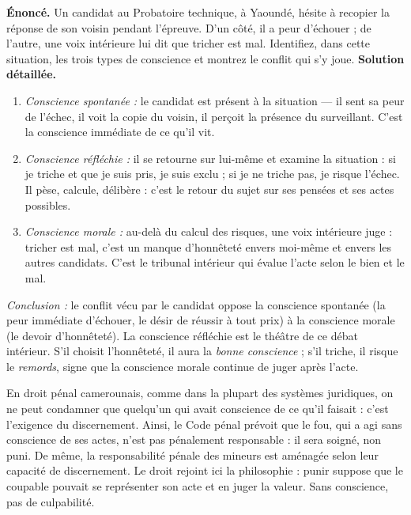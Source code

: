 \documentclass[11pt]{article}
\newcommand{\cle}[1]{{\popxbold\color{popdark}#1}}
\begin{document}
\begin{exoresolu}
\textbf{Énoncé.} Un candidat au Probatoire technique, à Yaoundé, hésite à recopier la réponse de son voisin pendant l'épreuve. D'un côté, il a peur d'échouer ; de l'autre, une voix intérieure lui dit que tricher est mal. Identifiez, dans cette situation, les trois types de conscience et montrez le conflit qui s'y joue.
\tcblower
\textbf{Solution détaillée.}
\begin{enumerate}
\item \emph{Conscience spontanée :} le candidat est présent à la situation — il sent sa peur de l'échec, il voit la copie du voisin, il perçoit la présence du surveillant. C'est la conscience immédiate de ce qu'il vit.
\item \emph{Conscience réfléchie :} il se retourne sur lui-même et examine la situation : \og si je triche et que je suis pris, je suis exclu ; si je ne triche pas, je risque l'échec. \fg{} Il pèse, calcule, délibère : c'est le retour du sujet sur ses pensées et ses actes possibles.
\item \emph{Conscience morale :} au-delà du calcul des risques, une voix intérieure juge : \og tricher est mal, c'est un manque d'honnêteté envers moi-même et envers les autres candidats. \fg{} C'est le tribunal intérieur qui évalue l'acte selon le bien et le mal.
\end{enumerate}
\emph{Conclusion :} le conflit vécu par le candidat oppose la conscience spontanée (la peur immédiate d'échouer, le désir de réussir à tout prix) à la conscience morale (le devoir d'honnêteté). La conscience réfléchie est le théâtre de ce débat intérieur. S'il choisit l'honnêteté, il aura la \emph{bonne conscience} ; s'il triche, il risque le \emph{remords}, signe que la conscience morale continue de juger après l'acte.
\end{exoresolu}

\begin{savaistu}
En droit pénal camerounais, comme dans la plupart des systèmes juridiques, on ne peut condamner que quelqu'un qui avait conscience de ce qu'il faisait : c'est l'exigence du \cle{discernement}. Ainsi, le Code pénal prévoit que le fou, qui a agi sans conscience de ses actes, n'est pas pénalement responsable : il sera soigné, non puni. De même, la responsabilité pénale des mineurs est aménagée selon leur capacité de discernement. Le droit rejoint ici la philosophie : punir suppose que le coupable pouvait se représenter son acte et en juger la valeur. Sans conscience, pas de culpabilité.
\end{savaistu}
\end{document}
